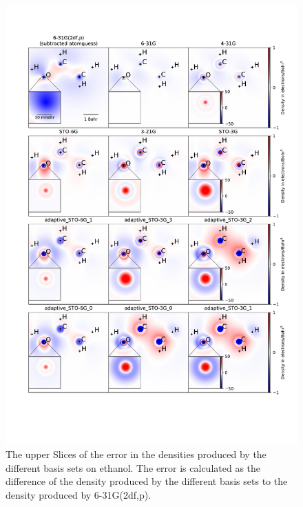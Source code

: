 \begin{figure}
    \includegraphics[trim={2cm 4.5cm 1.0cm 3.cm},clip,width=1.\textwidth]{chapters/results/results_images/adaptive_basis_functions/adaptive_basis_set_slices}
    \caption{The upper Slices of the error in the densities produced by the different basis sets on ethanol. The error is calculated as the difference of the density produced by the different basis sets to the density produced by 6-31G(2df,p).} \label{fig:adaptive_basis_set_slices}
\end{figure}


